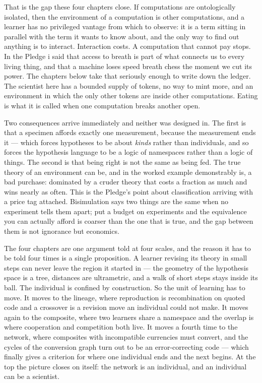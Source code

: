 \documentclass[12pt,openright,twoside]{book}
\theoremstyle{remark}
\theoremstyle{plain}
\theoremstyle{remark}
\theoremstyle{plain}
\theoremstyle{plain}
\begin{document}
That is the gap these four chapters close.
If computations are ontologically isolated, then the environment of a
computation is other computations, and a learner has no privileged vantage
from which to observe: it is a term sitting in parallel with the term it
wants to know about, and the only way to find out anything is to interact.
Interaction costs.
A computation that cannot pay stops.
In the Pledge i said that access to breath is part of what connects us to
every living thing, and that a machine loses speed breath chess the moment
we cut its power.
The chapters below take that seriously enough to write down the ledger.
The scientist here has a bounded supply of tokens, no way to mint more, and
an environment in which the only other tokens are inside other
computations.
Eating is what it is called when one computation breaks another open.

Two consequences arrive immediately and neither was designed in.
The first is that a specimen affords exactly one measurement, because the
measurement ends it --- which forces hypotheses to be about \emph{kinds}
rather than individuals, and so forces the hypothesis language to be a
logic of namespaces rather than a logic of things.
The second is that being right is not the same as being fed.
The true theory of an environment can be, and in the worked example
demonstrably is, a bad purchase: dominated by a cruder theory that costs a
fraction as much and wins nearly as often.
This is the Pledge's point about classification arriving with a price tag
attached.
Bisimulation says two things are the same when no experiment tells them
apart; put a budget on experiments and the equivalence you can actually
afford is coarser than the one that is true, and the gap between them is
not ignorance but economics.

The four chapters are one argument told at four scales, and the reason it
has to be told four times is a single proposition.
A learner revising its theory in small steps can never leave the region it
started in --- the geometry of the hypothesis space is a tree, distances are
ultrametric, and a walk of short steps stays inside its ball.
The individual is confined by construction.
So the unit of learning has to move.
It moves to the lineage, where reproduction is recombination on quoted code
and a crossover is a revision move an individual could not make.
It moves again to the composite, where two learners share a namespace and
the overlap is where cooperation and competition both live.
It moves a fourth time to the network, where composites with incompatible
currencies must convert, and the cycles of the conversion graph turn out to
be an error-correcting code --- which finally gives a criterion for where one
individual ends and the next begins.
At the top the picture closes on itself: the network is an individual, and
an individual can be a scientist.
\end{document}

